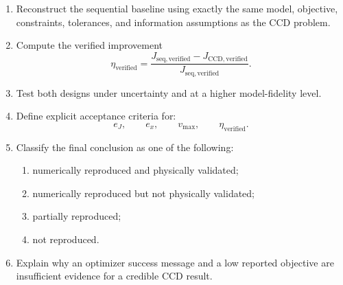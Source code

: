 \begin{enumerate}
    \item Reconstruct the sequential baseline using exactly the same model,
    objective, constraints, tolerances, and information assumptions as the
    CCD problem.

    \item Compute the verified improvement
    \begin{equation}
    \eta_{\mathrm{verified}}
    =
    \frac{
    J_{\mathrm{seq,verified}}
    -
    J_{\mathrm{CCD,verified}}
    }{
    J_{\mathrm{seq,verified}}
    }.
    \end{equation}

    \item Test both designs under uncertainty and at a higher model-fidelity
    level.

    \item Define explicit acceptance criteria for:
    \begin{equation}
    e_J,
    \qquad
    e_x,
    \qquad
    v_{\max},
    \qquad
    \eta_{\mathrm{verified}}.
    \end{equation}

    \item Classify the final conclusion as one of the following:
    \begin{enumerate}
        \item numerically reproduced and physically validated;
        \item numerically reproduced but not physically validated;
        \item partially reproduced;
        \item not reproduced.
    \end{enumerate}

    \item Explain why an optimizer success message and a low reported
    objective are insufficient evidence for a credible CCD result.
\end{enumerate}
